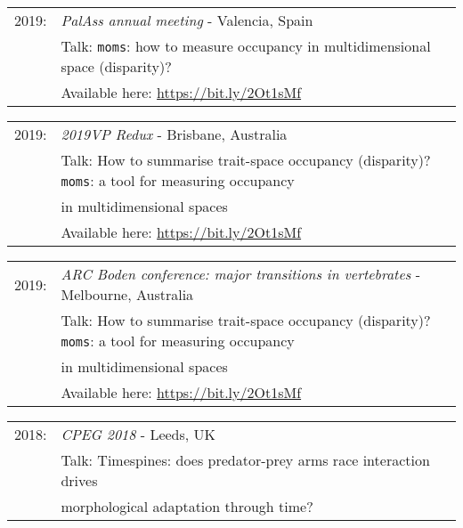 \documentclass[10pt,a4paper]{article}
\begin{document}
{%
\begin{tabular}{ll}
2019: & \textit{PalAss annual meeting} - Valencia, Spain\\
      & Talk: \texttt{moms}: how to measure occupancy in multidimensional space (disparity)?\\
      & Available here: \href{https://figshare.com/articles/Shifting_spaces_which_disparity_or_dissimilarity_metrics_best_summarise_occupancy_in_multidimensional_spaces_/9922961}{https://bit.ly/2Ot1sMf}\\
\end{tabular}
\begin{tabular}{ll}
2019: & \textit{2019VP Redux} - Brisbane, Australia\\
      & Talk: How to summarise trait-space occupancy (disparity)? \texttt{moms}: a tool for measuring occupancy\\
      & in multidimensional spaces\\
      & Available here: \href{https://figshare.com/articles/Shifting_spaces_which_disparity_or_dissimilarity_metrics_best_summarise_occupancy_in_multidimensional_spaces_/9922961}{https://bit.ly/2Ot1sMf}\\
\end{tabular}
\begin{tabular}{ll}    
2019: & \textit{ARC Boden conference: major transitions in vertebrates} - Melbourne, Australia\\
      & Talk: How to summarise trait-space occupancy (disparity)? \texttt{moms}: a tool for measuring occupancy\\
      & in multidimensional spaces\\
      & Available here: \href{https://figshare.com/articles/Shifting_spaces_which_disparity_or_dissimilarity_metrics_best_summarise_occupancy_in_multidimensional_spaces_/9922961}{https://bit.ly/2Ot1sMf}\\
\end{tabular}
\begin{tabular}{ll}
2018: & \textit{CPEG 2018} - Leeds, UK\\
      & Talk: Timespines: does predator-prey arms race interaction drives\\
      & morphological adaptation through time?\\
\end{tabular}
}
\end{document}
